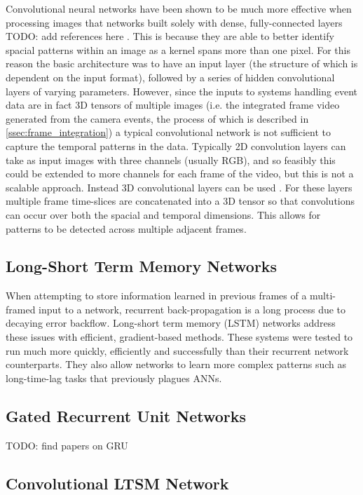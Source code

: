 Convolutional neural networks have been shown to be much more effective when processing images that networks built solely with dense, fully-connected layers \color{red} TODO: add references here \color{black}. This is because they are able to better identify spacial patterns within an image as a kernel spans more than one pixel. For this reason the basic architecture was to have an input layer (the structure of which is dependent on the input format), followed by a series of hidden convolutional layers of varying parameters.
However, since the inputs to systems handling event data are in fact 3D tensors of multiple images (i.e. the integrated frame video generated from the camera events, the process of which is described in \cref{ssec:frame_integration}) a typical convolutional network is not sufficient to capture the temporal patterns in the data. Typically 2D convolution layers can take as input images with three channels (usually RGB), and so feasibly this could be extended to more channels for each frame of the video, but this is not a scalable approach. Instead 3D convolutional layers can be used \cite{3DConv}. For these layers multiple frame time-slices are concatenated into a 3D tensor so that convolutions can occur over both the spacial and temporal dimensions. This allows for patterns to be detected across multiple adjacent frames.

\subsection{Long-Short Term Memory Networks}

When attempting to store information learned in previous frames of a multi-framed input to a network, recurrent back-propagation is a long process due to decaying error backflow. Long-short term memory (LSTM) networks\cite{LSTM} address these issues with efficient, gradient-based methods. These systems were tested to run much more quickly, efficiently and successfully than their recurrent network counterparts. They also allow networks to learn more complex patterns such as long-time-lag tasks that previously plagues ANNs.

\subsection{Gated Recurrent Unit Networks}

\color{red} TODO: find papers on GRU \color{black}

\subsection{Convolutional LTSM Network} \label{ssec:conv_lstm}

